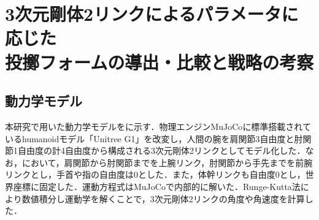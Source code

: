 \section{3次元剛体2リンクによるパラメータに応じた\\投擲フォームの導出・比較と戦略の考察}
\subsection{動力学モデル}
本研究で用いた動力学モデルをに示す．物理エンジンMuJoCo\cite{mujoco}に標準搭載されているhumanoidモデル「Unitree G1」\cite{unitreeg1}を改変し，人間の腕を肩関節3自由度と肘関節1自由度の計4自由度から構成される3次元剛体2リンクとしてモデル化した．なお，において，肩関節から肘関節までを上腕リンク，肘関節から手先までを前腕リンクとし，手首や指の自由度は0とした．また，体幹リンクも自由度0とし，世界座標に固定した．運動方程式はMuJoCoで内部的に解いた．Runge-Kutta法により数値積分し運動学を解くことで，3次元剛体2リンクの角度や角速度を計算した．
